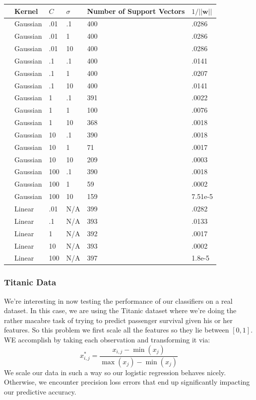 \documentclass[10pt]{article}
\begin{document}
\begin{table}
\centering
\begin{tabular}{llllll}
\toprule
{} &                        Kernel &      $C$ &   $\sigma$ &    Number of Support Vectors & $1/||\mathbf{w}||$ \\
\midrule
&    Gaussian &    .01 &    .1 &   400 &    .0286 \\
&    Gaussian &    .01 &    1 &   400 &    .0286 \\
&    Gaussian &    .01 &    10 &   400 &    .0286 \\
&    Gaussian &    .1 &    .1 &   400 &    .0141 \\
&    Gaussian &    .1 &    1 &   400 &    .0207 \\
&    Gaussian &    .1 &    10 &   400 &    .0141 \\
&    Gaussian &    1 &    .1 &   391 &    .0022 \\
&    Gaussian &    1 &    1 &   100 &    .0076 \\
&    Gaussian &    1 &    10 &   368 &    .0018 \\
&    Gaussian &    10 &    .1 &   390 &    .0018 \\
&    Gaussian &    10 &    1 &   71 &    .0017 \\
&    Gaussian &    10 &    10 &   209 &    .0003 \\
&    Gaussian &    100 &    .1 &   390 &    .0018 \\
&    Gaussian &    100 &    1 &   59 &    .0002 \\
&    Gaussian &    100 &    10 &   159 &    7.51e-5 \\
&    Linear &    .01 &    N/A &   399 &    .0282 \\
&    Linear &    .1 &    N/A &   393 &    .0133 \\
&    Linear &    1 &    N/A &   392 &    .0017 \\
&    Linear &    10 &    N/A &   393 &    .0002 \\
&    Linear &    100 &    N/A &   397 &    1.8e-5 \\
\midrule
\bottomrule
\end{tabular}
\end{table}


\subsubsection*{Titanic Data}
We're interesting in now testing the performance of our classifiers on a real dataset. In this case, we are using the Titanic dataset where we're doing the rather macabre task of trying to predict passenger survival given his or her features. So this problem we first scale all the features so they lie between $[0,1]$. WE accomplish by taking each observation and transforming it via:
\begin{equation*}
	x_{i,j}^* = \frac{x_{i,j}-\min(x_j)}{\max(x_j) - \min(x_j)}
\end{equation*}
We scale our data in such a way so our logistic regression behaves nicely. Otherwise, we encounter precision loss errors that end up significantly impacting our predictive accuracy. 
\end{document}
